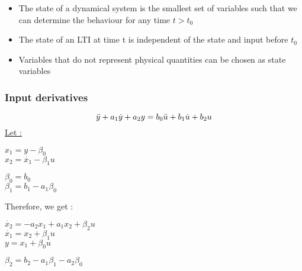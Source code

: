 \documentclass[../main.tex]{subfiles}
\begin{document}
\begin{itemize}
    \item The state of a dynamical system is the smallest set of variables such that we can determine the behaviour for any time $t>t_0$\\
    \item The state of an LTI at time t is independent of the state and input before $t_0$\\
    \item Variables that do not represent physical quantities can be chosen as state variables\\
\end{itemize}

\subsubsection{Input derivatives}
\begin{equation}
    \Ddot{y}+a_1\dot{y}+a_2 y = b_0  \Ddot{u} + b_1 \dot{u} + b_2 u
\end{equation}
\quad \underline{Let :}\\
\begin{minipage}{.5\textwidth}
    $x_1 = y-\beta_0$\\
    $x_2 = \dot{x_1} - \beta_1 u$\\
\end{minipage}
\begin{minipage}{.5\textwidth}
    $\beta_0 = b_0$\\
    $\beta_1 = b_1-a_1\beta_0$\\
\end{minipage}
Therefore, we get :\\
\begin{minipage}{.5\textwidth}
    $\dot{x_2} = -a_2 x_1 + a_1 x_2 + \beta_2 u$\\
    $\dot{x_1} = x_2 + \beta_1 u$\\
    $y = x_1+\beta_0 u$\\
\end{minipage}
\begin{minipage}{.5\textwidth}
    $\beta_2 = b_2 - a_1\beta_1 - a_2 \beta_0$\\
\end{minipage}
\end{document}
